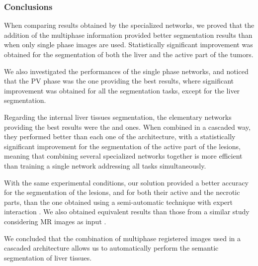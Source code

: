 \renewcommand{\baselinestretch}{1.75}
\renewcommand{\arraystretch}{5}

\subsubsection{Conclusions}

When comparing results obtained by the specialized networks, we proved
that the addition of the multiphase information provided better
segmentation results than when only single phase images are used.
Statistically significant improvement was obtained for the segmentation
of both the liver and the active part of the tumors.

We also investigated the performances of the single phase networks, and
noticed that the PV phase was the one providing the best results,
where significant improvement was obtained for all the segmentation
tasks, except for the liver segmentation.

Regarding the internal liver tissues segmentation, the elementary
networks providing the best results were the  
and  ones. When combined in a cascaded way, 
they performed better than each one of the  architecture, 
with a statistically significant improvement
for the segmentation of the active part of the lesions, meaning that 
combining several specialized networks together is more efficient 
than training a single network addressing all tasks simultaneously.

With the same experimental conditions, our solution provided a better
accuracy for the segmentation of the lesions, and for both their active
and the necrotic parts, than the one obtained using a semi-automatic
technique with expert interaction \cite{Ouhmich2019,Conze2017}. We also
obtained equivalent results than those from a similar study considering
MR images as input \cite{Zhang2018}.

We concluded that the combination of multiphase registered images used in a 
cascaded architecture allows us to automatically perform the semantic segmentation of liver tissues.

